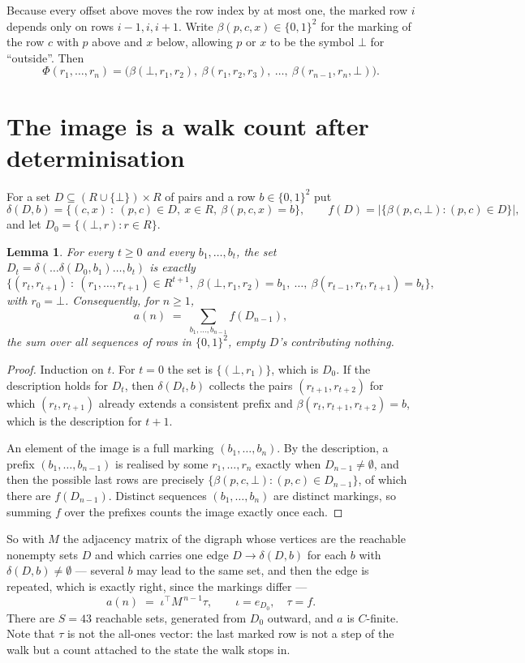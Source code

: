 \documentclass[11pt,a4paper]{article}
\theoremstyle{plain}
\newtheorem{lemma}[theorem]{Lemma}
\theoremstyle{definition}
\begin{document}
Because every offset above moves the row index by at most one, the marked row $i$ depends only
on rows $i-1,i,i+1$. Write $\beta(p,c,x)\in\{0,1\}^{2}$ for the marking of the row $c$
with $p$ above and $x$ below, allowing $p$ or $x$ to be the symbol $\bot$ for ``outside''.
Then
\[
\Phi(r_1,\dots,r_n)=\bigl(\beta(\bot,r_1,r_2),\ \beta(r_1,r_2,r_3),\ \dots,\
\beta(r_{n-1},r_n,\bot)\bigr).
\]

\section{The image is a walk count after determinisation}

For a set $D\subseteq(R\cup\{\bot\})\times R$ of pairs and a row $b\in\{0,1\}^{2}$ put
\[
\delta(D,b)=\{(c,x)\ :\ (p,c)\in D,\ x\in R,\ \beta(p,c,x)=b\},\qquad
f(D)=\bigl|\{\beta(p,c,\bot):(p,c)\in D\}\bigr| ,
\]
and let $D_0=\{(\bot,r):r\in R\}$.

\begin{lemma}\label{lem:det}
For every $t\ge0$ and every $b_1,\dots,b_t$, the set
$D_t=\delta(\dots\delta(D_0,b_1)\dots,b_t)$ is exactly
\[
\{(r_t,r_{t+1})\ :\ (r_1,\dots,r_{t+1})\in R^{t+1},\ \beta(\bot,r_1,r_2)=b_1,\ \dots,\
\beta(r_{t-1},r_t,r_{t+1})=b_t\} ,
\]
with $r_0=\bot$. Consequently, for $n\ge1$,
\[
a(n)\;=\;\sum_{b_1,\dots,b_{n-1}}f(D_{n-1}),
\]
the sum over all sequences of rows in $\{0,1\}^{2}$, empty $D$'s contributing nothing.
\end{lemma}

\begin{proof}
Induction on $t$. For $t=0$ the set is $\{(\bot,r_1)\}$, which is $D_0$. If the description
holds for $D_t$, then $\delta(D_t,b)$ collects the pairs $(r_{t+1},r_{t+2})$ for which
$(r_t,r_{t+1})$ already extends a consistent prefix and
$\beta(r_t,r_{t+1},r_{t+2})=b$, which is the description for $t+1$.

An element of the image is a full marking $(b_1,\dots,b_n)$. By the description, a prefix
$(b_1,\dots,b_{n-1})$ is realised by some $r_1,\dots,r_n$ exactly when $D_{n-1}\neq
\emptyset$, and then the possible last rows are precisely
$\{\beta(p,c,\bot):(p,c)\in D_{n-1}\}$, of which there are $f(D_{n-1})$. Distinct
sequences $(b_1,\dots,b_n)$ are distinct markings, so summing $f$ over the prefixes counts the
image exactly once each.
\end{proof}

So with $M$ the adjacency matrix of the digraph whose vertices are the reachable nonempty sets
$D$ and which carries one edge $D\to\delta(D,b)$ for each $b$ with $\delta(D,b)\neq\emptyset$
--- several $b$ may lead to the same set, and then the edge is repeated, which is exactly
right, since the markings differ ---
\[
a(n)\;=\;\iota^{\!\top}M^{\,n-1}\tau,\qquad \iota=e_{D_0},\quad \tau=f .
\]
There are $S=43$ reachable sets, generated from $D_0$ outward, and $a$ is $C$-finite. Note
that $\tau$ is not the all-ones vector: the last marked row is not a step of the walk but a
count attached to the state the walk stops in.
\end{document}
